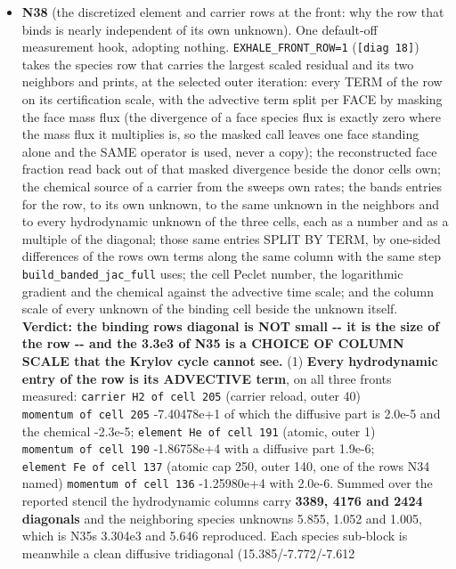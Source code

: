 \documentclass[english,a4paper]{my_memo}
\begin{document}
\begin{itemize}
\item
  \textbf{N38} (the discretized element and carrier rows at the front: why the row
  that binds is nearly independent of its own unknown). One default-off
  measurement hook, adopting nothing. \texttt{EXHALE\_FRONT\_ROW=1} (\texttt{{[}diag\ 18{]}})
  takes the species row that carries the largest scaled residual and its two
  neighbors and prints, at the selected outer iteration: every TERM of the
  row on its certification scale, with the advective term split per FACE by
  masking the face mass flux (the divergence of a face species flux is
  exactly zero where the mass flux it multiplies is, so the masked call
  leaves one face standing alone and the SAME operator is used, never a
  copy); the reconstructed face fraction read back out of that masked
  divergence beside the donor cell\textquotesingle s own; the chemical source of a carrier
  from the sweep\textquotesingle s own rates; the band\textquotesingle s entries for the row, to its own
  unknown, to the same unknown in the neighbors and to every hydrodynamic
  unknown of the three cells, each as a number and as a multiple of the
  diagonal; those same entries SPLIT BY TERM, by one-sided differences of
  the row\textquotesingle s own terms along the same column with the same step
  \texttt{build\_banded\_jac\_full} uses; the cell Peclet number, the logarithmic
  gradient and the chemical against the advective time scale; and the column
  scale of every unknown of the binding cell beside the unknown itself.
  \textbf{Verdict: the binding row\textquotesingle s diagonal is NOT small -\/- it is the size of the
  row -\/- and the 3.3e3 of N35 is a CHOICE OF COLUMN SCALE that the Krylov
  cycle cannot see.} (1) \textbf{Every hydrodynamic entry of the row is its
  ADVECTIVE term}, on all three fronts measured: \texttt{carrier\ H2\ of\ cell\ 205}
  (carrier reload, outer 40) \texttt{momentum\ of\ cell\ 205} -7.40478e+1 of which the
  diffusive part is 2.0e-5 and the chemical -2.3e-5; \texttt{element\ He\ of\ cell\ 191}
  (atomic, outer 1) \texttt{momentum\ of\ cell\ 190} -1.86758e+4 with a diffusive part
  1.9e-6; \texttt{element\ Fe\ of\ cell\ 137} (atomic cap 250, outer 140, one of the
  rows N34 named) \texttt{momentum\ of\ cell\ 136} -1.25980e+4 with 2.0e-6. Summed
  over the reported stencil the hydrodynamic columns carry \textbf{3389, 4176 and
  2424 diagonals} and the neighboring species unknowns 5.855, 1.052 and
  1.005, which is N35\textquotesingle s 3.304e3 and 5.646 reproduced. Each species
  sub-block is meanwhile a clean diffusive tridiagonal (15.385/-7.772/-7.612

\end{itemize}
\end{document}
